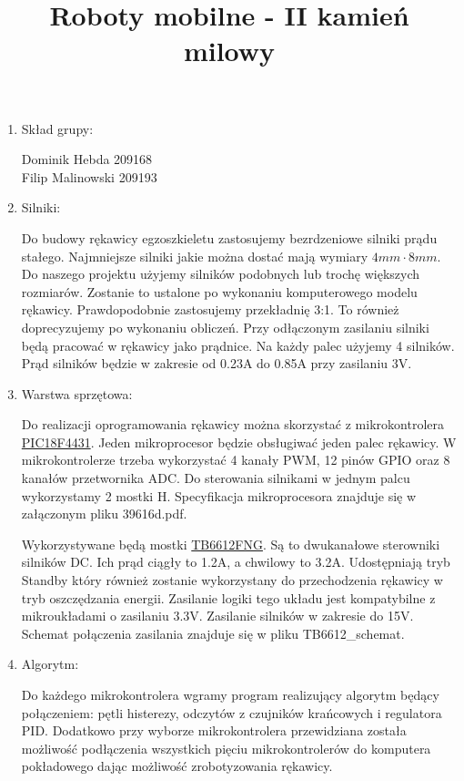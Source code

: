 \documentclass[a4paper]{article}
\author{}
\title{Roboty mobilne - II kamień milowy}
\date{}
\begin{document}
\maketitle

\begin{enumerate}

\item Skład grupy:

Dominik Hebda 209168 \\
Filip Malinowski 209193

\item Silniki:

Do budowy rękawicy egzoszkieletu zastosujemy bezrdzeniowe silniki prądu stałego. Najmniejsze silniki jakie można dostać mają wymiary
\begin{math}
4mm \cdot 8mm.
\end{math}
Do naszego projektu użyjemy silników podobnych lub trochę większych rozmiarów. Zostanie to ustalone po wykonaniu komputerowego modelu rękawicy. Prawdopodobnie zastosujemy przekładnię 3:1. To również doprecyzujemy po wykonaniu obliczeń. Przy odłączonym zasilaniu silniki będą pracować w rękawicy jako prądnice. Na każdy palec użyjemy 4 silników. Prąd silników będzie w zakresie od 0.23A do 0.85A przy zasilaniu 3V.

\item Warstwa sprzętowa:

Do realizacji oprogramowania rękawicy można skorzystać z mikrokontrolera
\href{http://www.microchip.com/wwwproducts/en/PIC18F4431}{PIC18F4431}.
Jeden mikroprocesor będzie obsługiwać jeden palec rękawicy. W mikrokontrolerze trzeba wykorzystać 4 kanały PWM, 12 pinów GPIO oraz 8 kanałów przetwornika ADC. Do sterowania silnikami w jednym palcu wykorzystamy 2 mostki H. Specyfikacja mikroprocesora znajduje się w załączonym pliku 39616d.pdf.

Wykorzystywane będą mostki 
\href{https://www.sparkfun.com/datasheets/Robotics/TB6612FNG.pdf}{TB6612FNG}. Są to dwukanałowe sterowniki silników DC. Ich prąd ciągły to 1.2A, a chwilowy to 3.2A. Udostępniają tryb Standby który również zostanie wykorzystany do przechodzenia rękawicy w tryb oszczędzania energii. Zasilanie logiki tego układu jest kompatybilne z mikroukładami o zasilaniu 3.3V. Zasilanie silników w zakresie do 15V. Schemat połączenia zasilania znajduje się w pliku TB6612\_schemat.


\item Algorytm:

Do każdego mikrokontrolera wgramy program realizujący algorytm będący połączeniem: pętli histerezy, odczytów z czujników krańcowych i regulatora PID. Dodatkowo przy wyborze mikrokontrolera przewidziana została możliwość podłączenia wszystkich pięciu mikrokontrolerów do komputera pokładowego dając możliwość zrobotyzowania rękawicy.


\end{enumerate}
\end{document}
